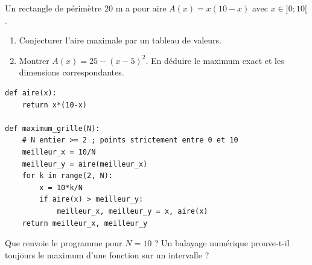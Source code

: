\begin{example}Un rectangle de périmètre $20$ m a pour aire $A(x)=x(10-x)$ avec $x\in]0;10[$.
\begin{enumerate}\item Conjecturer l'aire maximale par un tableau de valeurs.\item Montrer $A(x)=25-(x-5)^2$. En déduire le maximum exact et les dimensions correspondantes.\end{enumerate}\end{example}
\begin{lstlisting}
def aire(x):
    return x*(10-x)

def maximum_grille(N):
    # N entier >= 2 ; points strictement entre 0 et 10
    meilleur_x = 10/N
    meilleur_y = aire(meilleur_x)
    for k in range(2, N):
        x = 10*k/N
        if aire(x) > meilleur_y:
            meilleur_x, meilleur_y = x, aire(x)
    return meilleur_x, meilleur_y
\end{lstlisting}
\begin{example}Que renvoie le programme pour $N=10$ ? Un balayage numérique prouve-t-il toujours le maximum d'une fonction sur un intervalle ?\end{example}
